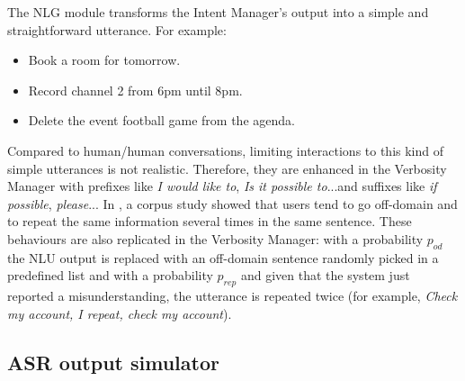 			The NLG module transforms the Intent Manager's output into a simple and straightforward utterance. For example:
			
			\begin{itemize}
				\item Book a room for tomorrow.
				\item Record channel 2 from 6pm until 8pm.
				\item Delete the event football game from the agenda.
			\end{itemize}
			
			Compared to human/human conversations, limiting interactions to this kind of simple utterances is not realistic. Therefore, they are enhanced in the Verbosity Manager with prefixes like \textit{I would like to}, \textit{Is it possible to}...and suffixes like \textit{if possible}, \textit{please}... In \cite{Ghigi2014}, a corpus study showed that users tend to go off-domain and to repeat the same information several times in the same sentence. These behaviours are also replicated in the Verbosity Manager: with a probability $p_{od}$ the NLU output is replaced with an off-domain sentence randomly picked in a predefined list and with a probability $p_{rep}$ and given that the system just reported a misunderstanding, the utterance is repeated twice (for example, \textit{Check my account, I repeat, check my account}).
			
		
    \subsection{ASR output simulator}
    \label{subsec:asroutputsimu}
		
